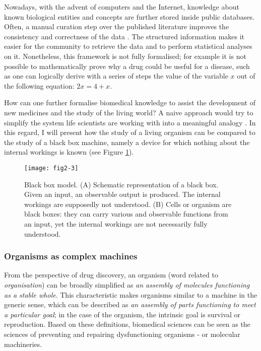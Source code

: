 Nowadays, with the advent of computers and the Internet, knowledge about known biological entities and concepts are further stored inside public databases. Often, a manual curation step over the published literature improves the consistency and correctness of the data \citep{brooksbank2014european}. The structured information makes it easier for the community to retrieve the data and to perform statistical analyses on it. Nonetheless, this framework is not fully formalised; for example it is not possible to mathematically prove why a drug could be useful for a disease, such as one can logically derive with a series of steps the value of the variable $ x $ out of the following equation: $ 2x = 4 + x $.

How can one further formalise biomedical knowledge to assist the development of new medicines and the study of the living world? A naive approach would try to simplify the system life scientists are working with into a meaningful analogy \citep{lazebnik2002can}. In this regard, I will present how the study of a living organism can be compared to the study of a black box machine, namely a device for which nothing about the internal workings is known (see Figure \ref{fig2-3}).

\begin{figure}[ht]
    \centering
    \texttt{[image: fig2-3]}
    \caption{Black box model. (A) Schematic representation of a black box. Given an input, an observable output is produced. The internal workings are supposedly not understood. (B) Cells or organism are black boxes: they can carry various and observable functions from an input, yet the internal workings are not necessarily fully understood.}
    \label{fig2-3}
\end{figure}

\subsubsection{Organisms as complex machines}

From the perspective of drug discovery, an organism (word related to \emph{organisation}) can be broadly simplified as \emph{an assembly of molecules functioning as a stable whole}. This characteristic makes organisms similar to a machine in the generic sense, which can be described as \emph{an assembly of parts functioning to meet a particular goal}; in the case of the organism, the intrinsic goal is survival or reproduction. Based on these definitions, biomedical sciences can be seen as the sciences of preventing and repairing dysfunctioning organisms - or molecular machineries.

